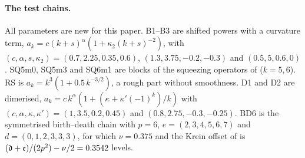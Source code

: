 \paragraph{The test chains.} All parameters are new for this paper. B1--B3 are
shifted powers with a curvature term, $a_k=c(k+s)^\alpha(1+\kappa_2(k+s)^{-2})$, with
$(c,\alpha,s,\kappa_2)=(0.7,2.25,0.35,0.6)$, $(1.3,3.75,-0.2,-0.3)$ and $(0.5,5,0.6,0)$. SQ5m0, SQ5m3 and
SQ6m1 are blocks of the squeezing operators of  ($k=5,6$). RS is $a_k=k^3(1+0.5\,k^{-3/2})$,
a rough part without smoothness. D1 and D2 are dimerised,
$a_k=c\,k^\alpha(1+(\kappa+\kappa'(-1)^k)/k)$ with $(c,\alpha,\kappa,\kappa')=(1,3.5,0.2,0.45)$ and
$(0.8,2.75,-0.3,-0.25)$. BD6 is the symmetrised birth--death chain with $p=6$,
$e=(2,3,4,5,6,7)$ and $d=(0,1,2,3,3,3)$, for which $\nu=0.375$ and the Krein offset of  is
$(\mathfrak d+\mathfrak e)/(2p^2)-\nu/2=0.3542$ levels.

\begin{table}[htbp]
\centering\small

\caption{Residuals at the largest level computed. For balanced chains the prediction is the
second-order constant $(\kappa_2+(2\alpha-1)/24)J_\alpha$ of  (for the squeezing blocks
$(k-1)^2J_{k/2}/(48k)$); for RS it is the constant of  plus the $N^{-1}$ term; for the
dimerised chains the residual relative to the offsets of  should tend to zero.
The full sequences over $N_\lambda=10\dots320$ are part of the data listed in .}
\label{tab:numerics}
\end{table}

